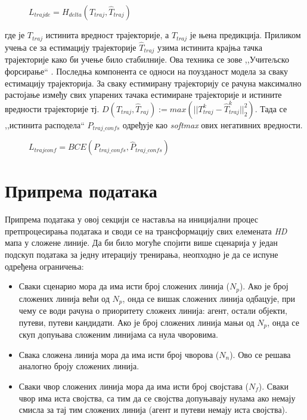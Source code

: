 \documentclass[11pt,oneside]{memoir}
\begin{document}
\begin{figure}[H]
  \centering
  $L_{trajde} = H_{delta} (T_{traj}, \hat{T}_{traj})$
\end{figure}

\noindent где је $T_{traj}$ истинита вредност трајекторије, а $\hat{T}_{traj}$ је њена предикција. Приликом учења се за естимацију трајекторије 
$\hat{T}_{traj}$ узима истинита крајња тачка трајекторије како би учење било стабилније. Ова техника се зове ,,Учитељско форсирање`` \cite{teacher_forcing}.
Последња компонента се односи на поузданост модела за сваку естимацију трајекторија. За сваку естимирану трајекторију се рачуна максимално растојање 
између свих упарених тачака естимиране трајекторије и истините вредности трајекторије тј. 
$D(T_{traj}, \hat{T}_{raj}) := max(||T^{k}_{traj} - \hat{T}^{k}_{traj}||^{2}_{2})$. Тада се ,,истинита расподела`` $P_{traj\_confs}$ одређује као \textit{softmax} 
ових негативних вредности.

\begin{figure}[H]
  \centering
  $L_{trajconf} = BCE(P_{traj\_confs}, \hat{P}_{traj\_confs})$
\end{figure}

\section{Припрема података}

Припрема података у овој секцији се наставља на иницијални процес претпроцесирања података и своди се на трансформацију свих елемената
\textit{HD} мапа у сложене линије. Да би било могуће спојити више сценарија у један подскуп података за једну итерацију тренирања, неопходно
је да се испуне одређена ограничења:
\begin{itemize}
  \item Сваки сценарио мора да има исти број сложених линија ($N_{p}$). Ако је број сложених линија већи од $N_{p}$, онда се 
        вишак сложених линија одбацује, при чему се води рачуна о приоритету сложеих линија: агент, остали објекти, путеви, путеви кандидати.
        Ако је број сложених линија мањи од $N_{p}$, онда се скуп допуњава сложеним линијама са нула чворовима.
  \item Свака сложена линија мора да има исти број чворова ($N_{n}$). Ово се решава аналогно броју сложених линија.
  \item Сваки чвор сложених линија мора да има исти број својстава ($N_{f}$). Сваки чвор има иста својства, са тим
        да се својства допуњавају нулама ако немају смисла за тај тим сложених линија (агент и путеви немају иста својства).
\end{itemize}
\end{document}
